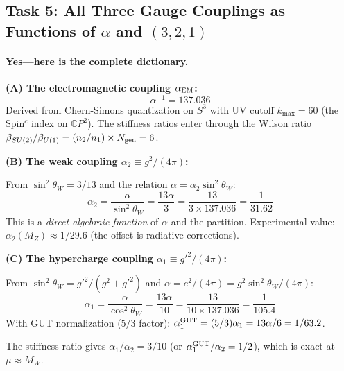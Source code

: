 \subsection{Task 5: All Three Gauge Couplings as Functions of $\alpha$ and $(3,2,1)$}
\label{sec:all-three}

\paragraph{Yes---here is the complete dictionary.}

\bigskip
\noindent\textbf{(A) The electromagnetic coupling $\alpha_{\rm EM}$:}
\begin{equation}
\boxed{\alpha^{-1} = 137.036}
\end{equation}
Derived from Chern-Simons quantization on $S^3$ with UV cutoff $k_{\max} = 60$ (the
Spin$^c$ index on $\mathbb{C}P^2$). The stiffness ratios enter through the Wilson ratio
$\beta_{SU(2)}/\beta_{U(1)} = (n_2/n_1) \times N_{\rm gen} = 6$.

\bigskip
\noindent\textbf{(B) The weak coupling $\alpha_2 \equiv g^2/(4\pi)$:}

From $\sin^2\theta_W = 3/13$ and the relation $\alpha = \alpha_2 \sin^2\theta_W$:
\begin{equation}
\boxed{\alpha_2 = \frac{\alpha}{\sin^2\theta_W} = \frac{13\alpha}{3} = \frac{13}{3 \times 137.036} = \frac{1}{31.62}}
\end{equation}
This is a \emph{direct algebraic function} of $\alpha$ and the partition.
Experimental value: $\alpha_2(M_Z) \approx 1/29.6$ (the offset is radiative corrections).

\bigskip
\noindent\textbf{(C) The hypercharge coupling $\alpha_1 \equiv g'^2/(4\pi)$:}

From $\sin^2\theta_W = g'^2/(g^2 + g'^2)$ and $\alpha = e^2/(4\pi) = g^2\sin^2\theta_W/(4\pi)$:
\begin{equation}
\boxed{\alpha_1 = \frac{\alpha}{\cos^2\theta_W} = \frac{13\alpha}{10} = \frac{13}{10 \times 137.036} = \frac{1}{105.4}}
\end{equation}
With GUT normalization ($5/3$ factor):
$\alpha_1^{\rm GUT} = (5/3)\alpha_1 = 13\alpha/6 = 1/63.2$.

The stiffness ratio gives $\alpha_1/\alpha_2 = 3/10$ (or $\alpha_1^{\rm GUT}/\alpha_2 = 1/2$),
which is exact at $\mu \approx M_W$.


